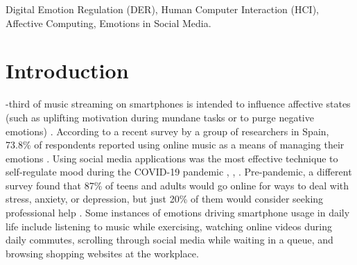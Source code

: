 \documentclass[lettersize,journal]{IEEEtran}
\begin{document}
\begin{IEEEkeywords}
Digital Emotion Regulation (DER), Human Computer Interaction (HCI), Affective Computing, Emotions in Social Media.
\end{IEEEkeywords}


\section{Introduction}
-third of music streaming on smartphones is intended to influence affective states (such as uplifting motivation during mundane tasks or to purge negative emotions) \cite{wadley2019use}. According to a recent survey by a group of researchers in Spain, 73.8\% of respondents reported using online music as a means of managing their emotions \cite{martin2021music}. Using social media applications was the most effective technique to self-regulate mood during the COVID-19 pandemic \cite{prikhidko2020effect}, \cite{shao2021social}, \cite{colasante2020any}. Pre-pandemic, a different survey found that 87\% of teens and adults would go online for ways to deal with stress, anxiety, or depression, but just 20\% of them would consider seeking professional help \cite{rideout2018digital}. Some instances of emotions driving smartphone usage in daily life include listening to music while exercising, watching online videos during daily commutes, scrolling through social media while waiting in a queue, and browsing shopping websites at the workplace.
    
\end{document}
